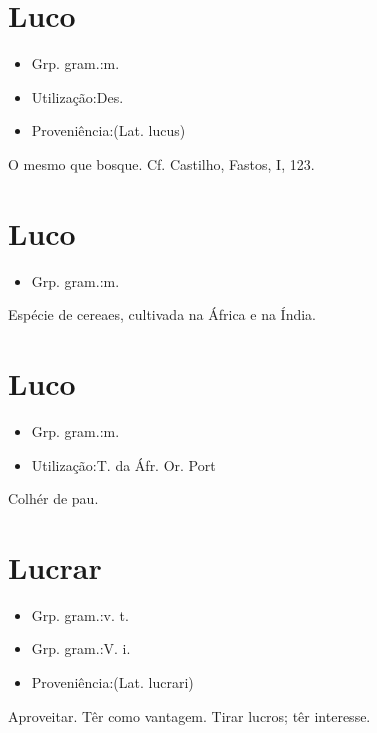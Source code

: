 \section{Luco}
\begin{itemize}
\item {Grp. gram.:m.}
\end{itemize}
\begin{itemize}
\item {Utilização:Des.}
\end{itemize}
\begin{itemize}
\item {Proveniência:(Lat. \textunderscore lucus\textunderscore )}
\end{itemize}
O mesmo que \textunderscore bosque\textunderscore . Cf. Castilho, \textunderscore Fastos\textunderscore , I, 123.
\section{Luco}
\begin{itemize}
\item {Grp. gram.:m.}
\end{itemize}
Espécie de cereaes, cultivada na África e na Índia.
\section{Luco}
\begin{itemize}
\item {Grp. gram.:m.}
\end{itemize}
\begin{itemize}
\item {Utilização:T. da Áfr. Or. Port}
\end{itemize}
Colhér de pau.
\section{Lucrar}
\begin{itemize}
\item {Grp. gram.:v. t.}
\end{itemize}
\begin{itemize}
\item {Grp. gram.:V. i.}
\end{itemize}
\begin{itemize}
\item {Proveniência:(Lat. \textunderscore lucrari\textunderscore )}
\end{itemize}
Aproveitar.
Têr como vantagem.
Tirar lucros; têr interesse.
